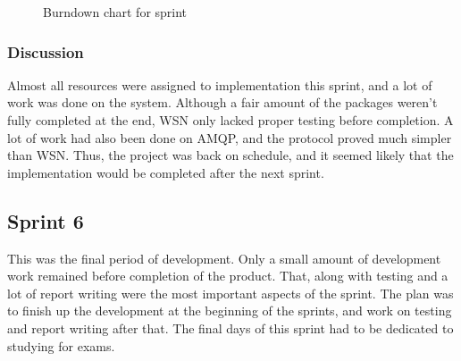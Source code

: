\begin{center}
  \begin{figure}[ht!]
    \caption{Burndown chart for sprint }
    \label{fig:sprint 5, burndown}
  \end{figure}
\end{center}


\subsubsection{Discussion}
\label{subsec:project_lifecycle-development-sprint_5-discussion}

Almost all resources were assigned to implementation this sprint, and a lot of work was done on the system. Although a fair amount of the packages weren't fully completed at the end, WSN only lacked proper testing before completion. A lot of work had also been done on AMQP, and the protocol proved much simpler than WSN. Thus, the project was back on schedule, and it seemed likely that the implementation would be completed after the next sprint.

\subsection{Sprint 6}
\label{subsec:project_lifecycle-development-sprint_6}

This was the final period of development. Only a small amount of development work remained before completion of the product. That, along with testing and a lot of report writing were the most important aspects of the sprint. The plan was to finish up the development at the beginning of the sprints, and work on testing and report writing after that. The final days of this sprint had to be dedicated to studying for exams.


